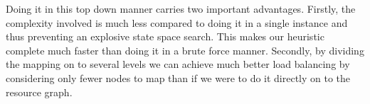 Doing it in this top down manner carries two important advantages. Firstly,
the complexity involved is much less compared to doing it in a single
instance and thus preventing an explosive state space search. This makes
our heuristic complete much faster than doing it in a brute force
manner. Secondly, by dividing the mapping on to several levels we can
achieve much better load balancing by considering only fewer nodes to
map than if we were to do it directly on to the resource graph.
